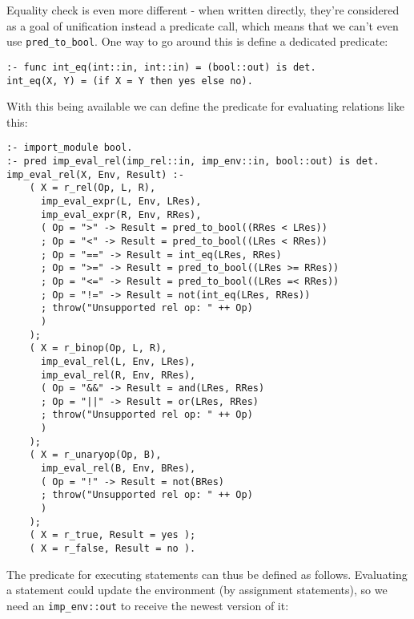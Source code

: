 Equality check is even more different - when written directly, they're considered as a goal of unification instead a predicate call, which means that we can't even use \texttt{pred_to_bool}. One way to go around this is define a dedicated predicate:

\begin{lstlisting}[language=Mercury]
:- func int_eq(int::in, int::in) = (bool::out) is det.
int_eq(X, Y) = (if X = Y then yes else no).
\end{lstlisting}

With this being available we can define the predicate for evaluating relations like this:

\begin{lstlisting}[language=Mercury]
:- import_module bool.
:- pred imp_eval_rel(imp_rel::in, imp_env::in, bool::out) is det.
imp_eval_rel(X, Env, Result) :-
	( X = r_rel(Op, L, R),
	  imp_eval_expr(L, Env, LRes),
	  imp_eval_expr(R, Env, RRes),
	  ( Op = ">" -> Result = pred_to_bool((RRes < LRes))
	  ; Op = "<" -> Result = pred_to_bool((LRes < RRes))
	  ; Op = "==" -> Result = int_eq(LRes, RRes)
	  ; Op = ">=" -> Result = pred_to_bool((LRes >= RRes))
	  ; Op = "<=" -> Result = pred_to_bool((LRes =< RRes))
	  ; Op = "!=" -> Result = not(int_eq(LRes, RRes))
	  ; throw("Unsupported rel op: " ++ Op)
	  )
	);
	( X = r_binop(Op, L, R),
	  imp_eval_rel(L, Env, LRes),
	  imp_eval_rel(R, Env, RRes),
	  ( Op = "&&" -> Result = and(LRes, RRes)
	  ; Op = "||" -> Result = or(LRes, RRes)
	  ; throw("Unsupported rel op: " ++ Op)
	  )
	);
	( X = r_unaryop(Op, B),
	  imp_eval_rel(B, Env, BRes),
	  ( Op = "!" -> Result = not(BRes)
	  ; throw("Unsupported rel op: " ++ Op)
	  )
	);
	( X = r_true, Result = yes );
	( X = r_false, Result = no ).
\end{lstlisting}

The predicate for executing statements can thus be defined as follows. Evaluating a statement could update the environment (by assignment statements), so we need an \texttt{imp_env::out} to receive the newest version of it:

